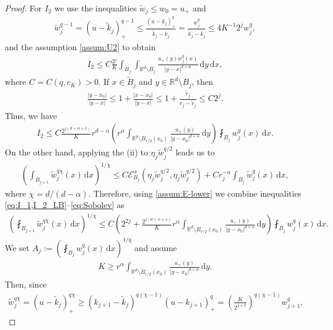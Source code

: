 \documentclass[reqno]{amsart}
\theoremstyle{plain}
\theoremstyle{definition}
\numberwithin{equation}{section}
\newcommand{\Rd}{\mathbb{R}^d}
\newcommand{\dx} {\, \mathrm{d}x}
\newcommand{\dy} {\, \mathrm{d}y}
\newcommand{\cK} {c_K}
\begin{document}
\begin{proof}
For $I_2$ we use the inequalities $\tilde{w}_j \leq w_0 = u_+$ and
\begin{align*}
\tilde{w}_j^{q-1} = (u - \tilde{k}_j)_+^{q-1} \leq \frac{(u-k_j)_+^q}{\tilde{k}_j - k_j}
= \frac{w_j^q}{\tilde{k}_j - k_j} \leq 4K^{-1} 2^j w_j^q,
\end{align*}
and the assumption \eqref{assum:U2} to obtain
\begin{align*}
I_2 \leq C \frac{2^j}{K} \int_{\tilde{B}_j} \int_{\Rd \setminus B_j}
\frac{u_+(y) w_j^q(x)}{|y-x|^{d+\alpha}} \dy \dx,
\end{align*}
where $C = C(q, \cK) > 0$. If $x\in \tilde{B}_j$ and $y \in \Rd \setminus B_j$, then
\begin{align*}
\frac{| y-x_0 |}{|y-x|} \leq 1+ \frac{| x-x_0 |}{|y-x|}
\leq 1+ \frac{\tilde{r}_j}{r_j - \tilde{r}_j} \leq C 2^j.
\end{align*}
Thus, we have
\begin{align} \label{eq:I_2_LB}
I_2 \leq C \frac{2^{j(d+\alpha+1)}}{K} r^{d-\alpha} \left( r^\alpha \int_{\Rd \setminus B_{r/2}(x_0)}
\frac{u_+(y)}{|y-x_0|^{d+\alpha}} \dy \right) \fint_{B_j} w_j^q(x) \dx.
\end{align}
On the other hand, applying the  (ii)
to $\eta_j \tilde{w}_j^{q/2}$ leads us to
\begin{align} \label{eq:Sobolev}
\left( \int_{B_{j+1}} \tilde{w}_j^{q \chi}(x) \dx \right)^{1/\chi} \leq C \mathcal{E}^{\alpha}_{B_j}\left( \eta_j \tilde{w}_j^{q/2}, \eta_j \tilde{w}_j^{q/2} \right) + C r_j^{-\alpha} \int_{B_j} \tilde{w}_j^q(x) \dx,
\end{align}
where $\chi = d/(d-\alpha)$. Therefore, using \eqref{assum:E-lower} we 
combine inequalities \eqref{eq:I_1,I_2_LB}--\eqref{eq:Sobolev} as
\begin{align*}
\left( \fint_{B_{j+1}} \tilde{w}_j^{q \chi}(x) \dx \right)^{1/\chi} 
\leq C \left( 2^{2j} + \frac{2^{j(d+\alpha+1)}}{K} r^\alpha\int_{\Rd \setminus B_{r/2}(x_0)} \frac{u_+(y)}{| y - x_0 |^{d+\alpha}} \dy \right) \fint_{B_j} w_j^q(x) \dx.
\end{align*}
We set $A_j := (\fint_{B_j} w_j^q(x) \dx)^{1/q}$ and assume
\begin{align} \label{eq:K}
K \geq r^\alpha \int_{\Rd \setminus B_{r/2}(x_0)} 
\frac{u_+(y)}{| y - x_0 |^{d+\alpha}} \dy.
\end{align}
Then, since
\begin{align*}
\tilde{w}_j^{q \chi} 
= (u - \tilde{k}_j)_+^{q \chi} 
\geq (k_{j+1} - \tilde{k}_j)^{q (\chi - 1)} (u - k_{j+1})_+^q
= \left( \frac{K}{2^{j+2}} \right)^{q(\chi-1)} w_{j+1}^q,

\end{align*}
\end{proof}
\end{document}
